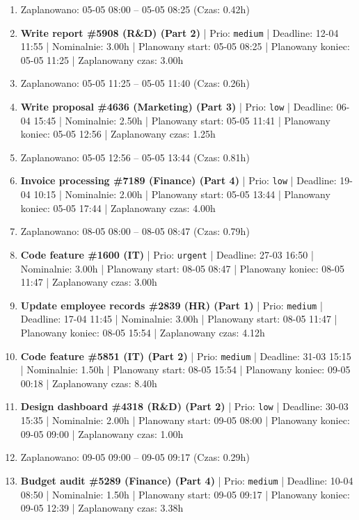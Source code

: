 {\begin{enumerate}
  \item [\textbf{PRZERWA}] Zaplanowano: 05-05 08:00 -- 05-05 08:25 (Czas: 0.42h)
  \item [\textbf{14674}] \textbf{Write report \#5908 (R\&D) (Part 2)} | Prio: \texttt{medium} | Deadline: 12-04 11:55 | Nominalnie: 3.00h | Planowany start: 05-05 08:25 | Planowany koniec: 05-05 11:25 | Zaplanowany czas: 3.00h
  \item [\textbf{PRZERWA}] Zaplanowano: 05-05 11:25 -- 05-05 11:40 (Czas: 0.26h)
  \item [\textbf{14684}] \textbf{Write proposal \#4636 (Marketing) (Part 3)} | Prio: \texttt{low} | Deadline: 06-04 15:45 | Nominalnie: 2.50h | Planowany start: 05-05 11:41 | Planowany koniec: 05-05 12:56 | Zaplanowany czas: 1.25h
  \item [\textbf{PRZERWA}] Zaplanowano: 05-05 12:56 -- 05-05 13:44 (Czas: 0.81h)
  \item [\textbf{14678}] \textbf{Invoice processing \#7189 (Finance) (Part 4)} | Prio: \texttt{low} | Deadline: 19-04 10:15 | Nominalnie: 2.00h | Planowany start: 05-05 13:44 | Planowany koniec: 05-05 17:44 | Zaplanowany czas: 4.00h
  \item [\textbf{PRZERWA}] Zaplanowano: 08-05 08:00 -- 08-05 08:47 (Czas: 0.79h)
  \item [\textbf{14605}] \textbf{Code feature \#1600 (IT)} | Prio: \texttt{urgent} | Deadline: 27-03 16:50 | Nominalnie: 3.00h | Planowany start: 08-05 08:47 | Planowany koniec: 08-05 11:47 | Zaplanowany czas: 3.00h
  \item [\textbf{14670}] \textbf{Update employee records \#2839 (HR) (Part 1)} | Prio: \texttt{medium} | Deadline: 17-04 11:45 | Nominalnie: 3.00h | Planowany start: 08-05 11:47 | Planowany koniec: 08-05 15:54 | Zaplanowany czas: 4.12h
  \item [\textbf{14643}] \textbf{Code feature \#5851 (IT) (Part 2)} | Prio: \texttt{medium} | Deadline: 31-03 15:15 | Nominalnie: 1.50h | Planowany start: 08-05 15:54 | Planowany koniec: 09-05 00:18 | Zaplanowany czas: 8.40h
  \item [\textbf{14691}] \textbf{Design dashboard \#4318 (R\&D) (Part 2)} | Prio: \texttt{low} | Deadline: 30-03 15:35 | Nominalnie: 2.00h | Planowany start: 09-05 08:00 | Planowany koniec: 09-05 09:00 | Zaplanowany czas: 1.00h
  \item [\textbf{PRZERWA}] Zaplanowano: 09-05 09:00 -- 09-05 09:17 (Czas: 0.29h)
  \item [\textbf{14630}] \textbf{Budget audit \#5289 (Finance) (Part 4)} | Prio: \texttt{medium} | Deadline: 10-04 08:50 | Nominalnie: 1.50h | Planowany start: 09-05 09:17 | Planowany koniec: 09-05 12:39 | Zaplanowany czas: 3.38h

\end{enumerate}}
